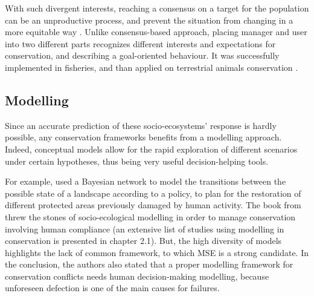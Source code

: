 \documentclass[12pt,a4paper]{article}
\begin{document}
With such divergent interests, reaching a consensus on a target for the population can be an unproductive process, and prevent the situation from changing in a more equitable way \citep{peterson2005conservation}.
Unlike consensus-based approach, placing manager and user into two different parts recognizes different interests and expectations for conservation, and describing a goal-oriented behaviour.
It was successfully implemented in fisheries, and than applied on terrestrial animals conservation \citep{BUNNEFELD2011441, bunnefeld2013incentivizing}.

\subsection{Modelling}

Since an accurate prediction of these socio-ecosystems' response is hardly possible, any conservation frameworks benefits from a modelling approach.
Indeed, conceptual models allow for the rapid exploration of different scenarios under certain hypotheses, thus being very useful decision-helping tools.
%

For example, \cite{rumpff2011state} used a Bayesian network to model the transitions between the possible state of a landscape according to a policy, to plan for the restoration of different protected areas previously damaged by human activity.
The book from \cite{schluter2012new} threw the stones of socio-ecological modelling in order to manage conservation involving human compliance (an extensive list of studies using modelling in conservation is presented in chapter 2.1).
But, the high diversity of models highlights the lack of common framework, to which MSE is a strong candidate.
In the conclusion, the authors also stated that a proper modelling framework for conservation conflicts needs human decision-making modelling, because unforeseen defection is one of the main causes for failures.\\
%
\end{document}
